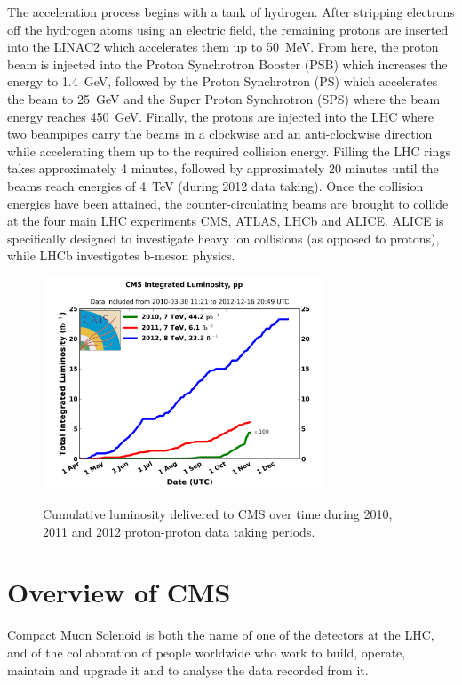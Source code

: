 The acceleration process begins with a tank of hydrogen. After stripping electrons off the hydrogen atoms
using an electric field, the remaining protons are inserted into the LINAC2 which accelerates them up to
50~MeV. From here, the proton beam is injected into the Proton Synchrotron Booster (PSB) which increases the
energy to 1.4~GeV, followed by the Proton Synchrotron (PS) which accelerates the beam to 25~GeV and the Super
Proton Synchrotron (SPS) where the beam energy reaches 450~GeV. Finally, the protons are injected into the LHC
where two beampipes carry the beams in a clockwise and an anti-clockwise direction while accelerating them
up to the required collision energy. Filling the LHC rings takes approximately 4 minutes, followed by
approximately 20 minutes until the beams reach energies of 4~TeV (during 2012 data taking). Once the collision
energies have been attained, the counter-circulating beams are brought to collide at the four main LHC
experiments CMS, ATLAS, LHCb and ALICE. ALICE is specifically designed to investigate heavy ion collisions
(as opposed to protons), while LHCb investigates b-meson physics.

\begin{figure}[hbtp]
   \centering
     \includegraphics[width=0.75\textwidth]{Chapters/03_Detector/Images/int_lumi_cumulative_pp_2.png}\\
     \caption{Cumulative luminosity delivered to CMS over time during 2010, 2011 and 2012 proton-proton data
     taking periods.}
     \label{fig:integrated_luminosity}
\end{figure}

\section{Overview of CMS}
\label{s:Overview}
Compact Muon Solenoid is both the name of one of the detectors at the LHC, and of the collaboration of
people worldwide who work to build, operate, maintain and upgrade it and to analyse the data recorded from it.

